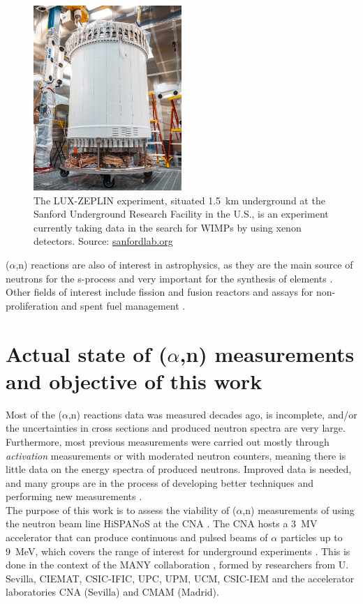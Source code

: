 \documentclass[a4paper,12pt]{report}
\newcommand{\an}{($\alpha$,n) }
\begin{document}
\begin{figure}[H]
	\centering
	\includegraphics[width=0.5\textwidth]{sanford.jpg}
	\caption{The LUX-ZEPLIN experiment, situated \qty{1.5}{\kilo\meter} underground at the Sanford Underground Research Facility in the U.S., is an experiment currently taking data in the search for WIMPs by using xenon detectors.
	Source: \href{https://sanfordlab.org/experiment/lux-zeplin}{sanfordlab.org}}
	\label{sanford}
\end{figure}

\an reactions are also of interest in astrophysics, as they are the main source of neutrons for the s-process and very important for the synthesis of elements \cite{astro1, astro2}.
Other fields of interest include fission and fusion reactors and assays for non-proliferation and spent fuel management \cite{INDC}.

\section{Actual state of \an measurements and objective of this work}
Most of the \an reactions data was measured decades ago, is incomplete, and/or the uncertainties in cross sections and produced neutron spectra are very large.
Furthermore, most previous measurements were carried out mostly through \textit{activation} measurements or with moderated neutron counters, meaning there is little data on the energy spectra of produced neutrons.
Improved data is needed, and many groups are in the process of developing better techniques and performing new measurements \cite{INDC}.
\\

The purpose of this work is to assess the viability of \an measurements of using the neutron beam line HiSPANoS at the CNA \cite{CNA}.
The CNA hosts a \qty{3}{\mega\volt} accelerator that can produce continuous and pulsed beams of $\alpha$ particles up to \qty{9}{\MeV}, which covers the range of interest for underground experiments \cite{hispanos}.
This is done in the context of the MANY collaboration \cite{MANY}, formed by researchers from U. Sevilla, CIEMAT, CSIC-IFIC, UPC, UPM, UCM, CSIC-IEM and the accelerator laboratories CNA (Sevilla) and CMAM (Madrid).
\\
\end{document}
